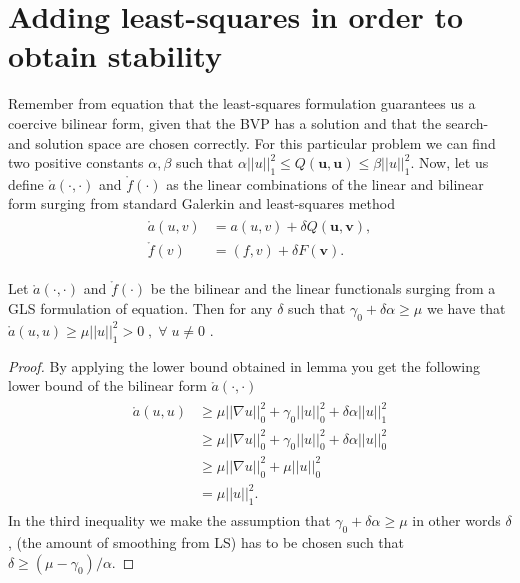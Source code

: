 \section{Adding least-squares in order to obtain stability}

Remember from equation that the least-squares formulation guarantees us a coercive bilinear form, given that the BVP has a solution and that the search- and solution space are chosen correctly. For this particular problem we can find two positive constants $\alpha,\beta$ such that $\alpha||u||_1^2 \leq Q(\mathbf{u},\mathbf{u}) \leq \beta||u||_1^2 $.
Now, let us define $\mathring{a}(\cdot,\cdot)$ and $\mathring{f}(\cdot)$ as the linear combinations of the linear and bilinear form surging from standard Galerkin and least-squares method
\begin{align}
	\begin{split}
	\mathring{a}(u,v) &= a(u,v) + \delta Q(\mathbf{u},\mathbf{\mathbf{v}}), \\
	 \mathring{f}(v) &= (f,v) + \delta F(\mathbf{\mathbf{v}}).
	\end{split}
	\label{eq:GLS}
\end{align}
\begin{lemma}
	Let $\mathring{a}(\cdot,\cdot)$ and $\mathring{f}(\cdot)$ be the bilinear and the linear functionals surging from a GLS formulation of equation. Then for any $\delta$ such that $\gamma_0+\delta \alpha \geq \mu $ we have that $\mathring{a}(u,u) \geq \mu ||u||_1^2>0 \; , \; \forall \; u \neq 0$ .
	\label{lemmaCoercive}
\end{lemma}

\begin{proof}
	
	
By applying the lower bound obtained in lemma  you get the following lower bound of the bilinear form $\mathring{a}(\cdot,\cdot)$
\begin{align}
	\begin{split}
	\mathring{a}(u,u) &\geq \mu ||\nabla u||_0^2+\gamma_0||u||_0^2+\delta \alpha ||u||^2_1 \\
	&\geq \mu ||\nabla u||_0^2+\gamma_0||u||_0^2+\delta \alpha ||u||^2_0 \\
	&\geq \mu ||\nabla u||_0^2+\mu ||u||_0^2 \\
	&= \mu ||u||^2_1.
	\end{split}
	\label{eq:coercivity}
\end{align}
In the third inequality we make the assumption that $\gamma_0+\delta \alpha \geq \mu $ in other words $\delta$, (the amount of smoothing from LS) has to be chosen such that $\delta \geq (\mu-\gamma_0)/\alpha$.
\end{proof}

